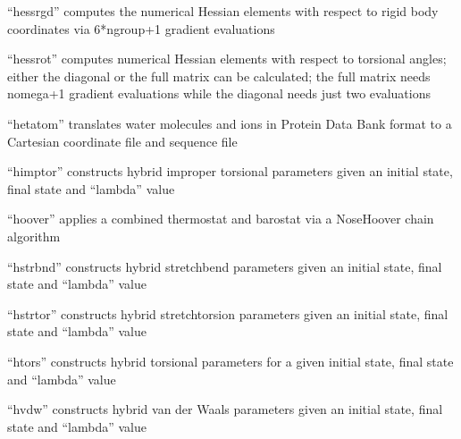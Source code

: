 \documentclass[letterpaper,11pt,english]{sphinxmanual}
\begin{document}
\sphinxAtStartPar
{}

\sphinxAtStartPar
“hessrgd” computes the numerical Hessian elements with respect to rigid body coordinates via 6*ngroup+1 gradient evaluations

\sphinxAtStartPar
{}

\sphinxAtStartPar
“hessrot” computes numerical Hessian elements with respect to torsional angles; either the diagonal or the full matrix can be calculated; the full matrix needs nomega+1 gradient evaluations while the diagonal needs just two evaluations

\sphinxAtStartPar
{}

\sphinxAtStartPar
“hetatom” translates water molecules and ions in Protein Data Bank format to a Cartesian coordinate file and sequence file

\sphinxAtStartPar
{}

\sphinxAtStartPar
“himptor” constructs hybrid improper torsional parameters given an initial state, final state and “lambda” value

\sphinxAtStartPar
{}

\sphinxAtStartPar
“hoover” applies a combined thermostat and barostat via a Nose\sphinxhyphen{}Hoover chain algorithm

\sphinxAtStartPar
{}

\sphinxAtStartPar
“hstrbnd” constructs hybrid stretch\sphinxhyphen{}bend parameters given an initial state, final state and “lambda” value

\sphinxAtStartPar
{}

\sphinxAtStartPar
“hstrtor” constructs hybrid stretch\sphinxhyphen{}torsion parameters given an initial state, final state and “lambda” value

\sphinxAtStartPar
{}

\sphinxAtStartPar
“htors” constructs hybrid torsional parameters for a given initial state, final state and “lambda” value

\sphinxAtStartPar
{}

\sphinxAtStartPar
“hvdw” constructs hybrid van der Waals  parameters given an initial state, final state and “lambda” value

\sphinxAtStartPar
{}
\end{document}
